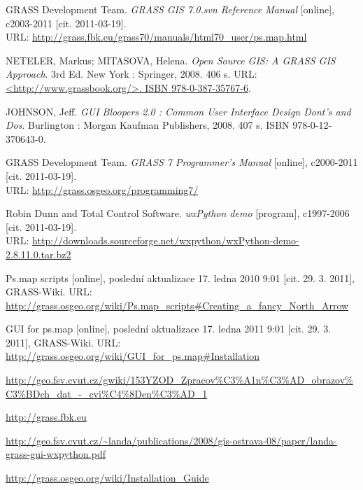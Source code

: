 \documentclass[a4paper,12pt,draft]{article}
\begin{document}
\begin{thebibliography}{9}
\label{literatura}
GRASS Development Team. \textit{GRASS GIS 7.0.svn Reference
Manual} [online], c2003-2011 [cit. 2011-03-19].\\ URL:
\url{http://grass.fbk.eu/grass70/manuals/html70_user/ps.map.html}

NETELER, Markus; MITASOVA, Helena. \textit{Open Source GIS: A
GRASS GIS Approach}. 3rd Ed. New York : Springer, 2008. 406 s. URL:
\url{<http://www.grassbook.org/>. ISBN 978-0-387-35767-6}.

JOHNSON, Jeff. \textit{GUI Bloopers 2.0 : Common User Interface Design
Dont's and Dos}. Burlington : Morgan Kaufman Publishers, 2008. 407 s. ISBN
978-0-12-370643-0.

GRASS Development Team. \textit{GRASS 7 Programmer's Manual} [online],
c2000-2011 [cit. 2011-03-19].\\ URL: \url{http://grass.osgeo.org/programming7/}

Robin Dunn and Total Control Software. \textit{wxPython
demo} [program], c1997-2006 [cit. 2011-03-19].\\ URL:
\url{http://downloads.sourceforge.net/wxpython/wxPython-demo-2.8.11.0.tar.bz2}

Ps.map scripts [online], poslední aktualizace
17. ledna 2010 9:01 [cit. 29. 3. 2011], GRASS-Wiki. URL:
\url{http://grass.osgeo.org/wiki/Ps.map_scripts#Creating_a_fancy_North_Arrow}

GUI for ps.map [online], poslední aktualizace
17. ledna 2011 9:01 [cit. 29. 3. 2011], GRASS-Wiki. URL:
\url{http://grass.osgeo.org/wiki/GUI_for_ps.map#Installation}

 \url{http://geo.fsv.cvut.cz/gwiki/153YZOD_Zpracov%C3%A1n%C3%AD_obrazov%C3%BDch_dat_-_cvi%C4%8Den%C3%AD_1}

\url{http://grass.fbk.eu}

\url{http://geo.fsv.cvut.cz/~landa/publications/2008/gis-ostrava-08/paper/landa-grass-gui-wxpython.pdf}
%

\url{http://grass.osgeo.org/wiki/Installation_Guide}



\end{thebibliography}
\end{document}
